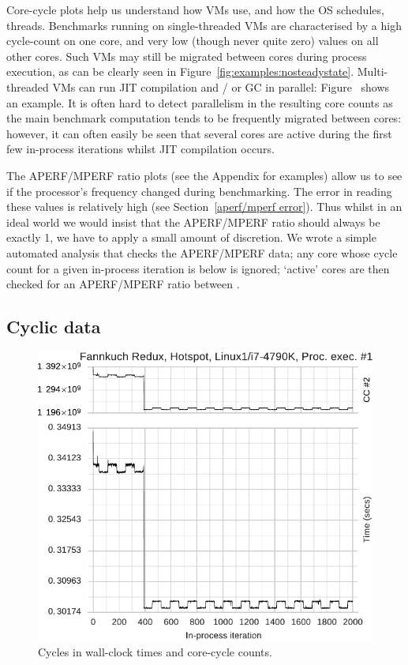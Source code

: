 \documentclass[preprint,numbers,10pt]{sigplanconf}
\begin{document}
Core-cycle plots help us understand how VMs use, and how the OS schedules,
threads. Benchmarks running on single-threaded VMs are characterised by a high
cycle-count on one core, and very low (though never quite zero) values on all
other cores. Such VMs may still be migrated between cores during process
execution, as can be clearly seen in Figure~\ref{fig:examples:nosteadystate}.
Multi-threaded VMs can run JIT compilation and / or GC in parallel:
Figure~ shows
an example. It is often hard to detect parallelism in the resulting core counts as
the main benchmark computation tends to be frequently migrated between cores:
however, it can often easily be seen that several cores are active during the first few
in-process iterations whilst JIT compilation occurs.

The APERF/MPERF ratio plots (see the Appendix for
examples) allow us to see if the processor's frequency changed during
benchmarking. The error in reading these values is relatively high (see
Section~\ref{aperf/mperf error}). Thus whilst in an ideal world we would
insist that the APERF/MPERF ratio should always be exactly 1, we have to apply a
small amount of discretion. We wrote a simple automated analysis that checks the
APERF/MPERF data; any core whose cycle count for a given in-process iteration is
below  is ignored; `active' cores are then checked for an
APERF/MPERF ratio between .


\subsection{Cyclic data}

\begin{figure}[tbp]
\centering
\includegraphics[width=.45\textwidth]{examples/new_cyclic.pdf}
\caption{Cycles in wall-clock times and core-cycle counts.}
\label{fig:examples:cycles}
\end{figure}
\end{document}
